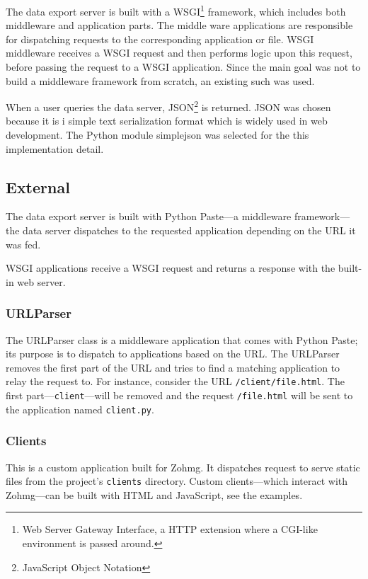 The data export server is built with a WSGI\footnote{Web Server Gateway
Interface, a HTTP extension where a CGI-like environment is passed around.}
framework, which includes both middleware and application parts. The middle
ware applications are responsible for dispatching requests to the corresponding
application or file. WSGI middleware receives a WSGI request and then performs
logic upon this request, before passing the request to a WSGI application.
\cite{paste,definitive_guide_to_pylons} Since the main goal was not to build a
middleware framework from scratch, an existing such was used.

When a user queries the data server, JSON\footnote{JavaScript Object Notation}
is returned. JSON was chosen because it is i simple text serialization format
which is widely used in web development. The Python module simplejson was
selected for the this implementation detail. \cite{simplejson}


\subsection*{External}

The data export server is built with Python Paste---a middleware
framework---the data server dispatches to the requested application
depending on the URL it was fed. \cite{paste}

WSGI applications receive a WSGI request and returns a response with the
built-in web server.


\subsubsection{URLParser}

The URLParser class is a middleware application that comes with Python Paste;
its purpose is to dispatch to applications based on the URL. The URLParser
removes the first part of the URL and tries to find a matching application to
relay the request to. For instance, consider the URL \texttt{/client/file.html}.
The first part---\texttt{client}---will be removed and the request
\texttt{/file.html} will be sent to the application named \texttt{client.py}.


\subsubsection{Clients}

This is a custom application built for Zohmg. It dispatches request to serve
static files from the project's \texttt{clients} directory. Custom
clients---which interact with Zohmg---can be built with HTML and JavaScript, see
the examples.


